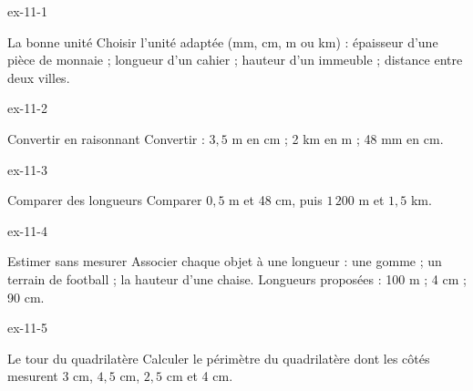 \clearpage{}
\begin{blocLivre}{ex-11-1}\begin{exercice}[1]{La bonne unité}
Choisir l’unité adaptée (mm, cm, m ou km) : épaisseur d’une pièce de monnaie ; longueur d’un cahier ; hauteur d’un immeuble ; distance entre deux villes.
\end{exercice}\end{blocLivre}
\begin{blocLivre}{ex-11-2}\begin{exercice}[1]{Convertir en raisonnant}
Convertir : $3{,}5$ m en cm ; 2 km en m ; 48 mm en cm.
\end{exercice}\end{blocLivre}
\begin{blocLivre}{ex-11-3}\begin{exercice}[1]{Comparer des longueurs}
Comparer $0{,}5$ m et 48 cm, puis $1\,200$ m et $1{,}5$ km.
\end{exercice}\end{blocLivre}
\begin{blocLivre}{ex-11-4}\begin{exercice}[1]{Estimer sans mesurer}
Associer chaque objet à une longueur : une gomme ; un terrain de football ; la hauteur d’une chaise. Longueurs proposées : 100 m ; 4 cm ; 90 cm.
\end{exercice}\end{blocLivre}
\begin{blocLivre}{ex-11-5}\begin{exercice}[1]{Le tour du quadrilatère}
Calculer le périmètre du quadrilatère dont les côtés mesurent 3 cm, $4{,}5$ cm, $2{,}5$ cm et 4 cm.
\label{fig-ex-11-5}
\end{exercice}\end{blocLivre}


